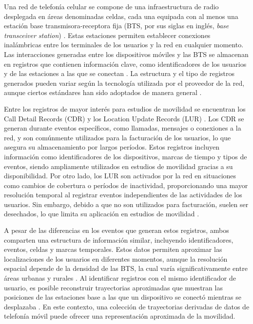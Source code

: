 Una red de telefonía celular se compone de una infraestructura de radio desplegada en áreas denominadas celdas, cada una equipada con al menos una estación base transmisora-receptora fija (BTS, por sus siglas en inglés, \textit{base transceiver station}) \cite{sharma2012cell}. Estas estaciones permiten establecer conexiones inalámbricas entre los terminales de los usuarios y la red en cualquier momento. Las interacciones generadas entre los dispositivos móviles y las BTS se almacenan en registros que contienen información clave, como identificadores de los usuarios y de las estaciones a las que se conectan \cite{yuan2013characterizing}. La estructura y el tipo de registros generados pueden variar según la tecnología utilizada por el proveedor de la red, aunque ciertos estándares han sido adoptados de manera general \cite{durive2021sistema}.

Entre los registros de mayor interés para estudios de movilidad se encuentran los Call Detail Records (CDR) y los Location Update Records (LUR) \cite{gutierrez2020como}. Los CDR se generan durante eventos específicos, como llamadas, mensajes o conexiones a la red, y son comúnmente utilizados para la facturación de los usuarios, lo que asegura su almacenamiento por largos períodos. Estos registros incluyen información como identificadores de los dispositivos, marcas de tiempo y tipos de eventos, siendo ampliamente utilizados en estudios de movilidad gracias a su disponibilidad. Por otro lado, los LUR son activados por la red en situaciones como cambios de cobertura o períodos de inactividad, proporcionando una mayor resolución temporal al registrar eventos independientes de las actividades de los usuarios. Sin embargo, debido a que no son utilizados para facturación, suelen ser desechados, lo que limita su aplicación en estudios de movilidad \cite{durive2021sistema}.

A pesar de las diferencias en los eventos que generan estos registros, ambos comparten una estructura de información similar, incluyendo identificadores, eventos, celdas y marcas temporales. Estos datos permiten aproximar las localizaciones de los usuarios en diferentes momentos, aunque la resolución espacial depende de la densidad de las BTS, la cual varía significativamente entre áreas urbanas y rurales \cite{forghani2020cellular}. Al identificar registros con el mismo identificador de usuario, es posible reconstruir trayectorias aproximadas que muestran las posiciones de las estaciones base a las que un dispositivo se conectó mientras se desplazaba \cite{chen2018individual}. En este contexto, una colección de trayectorias derivadas de datos de telefonía móvil puede ofrecer una representación aproximada de la movilidad.

